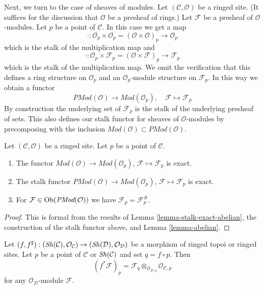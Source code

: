 \noindent
Next, we turn to the case of sheaves of modules.
Let $(\mathcal{C}, \mathcal{O})$ be a ringed site.
(It suffices for the discussion that $\mathcal{O}$ be a presheaf
of rings.)
Let $\mathcal{F}$ be a presheaf of $\mathcal{O}$-modules.
Let $p$ be a point of $\mathcal{C}$. In this case we get a map
$$
\cdot :
\mathcal{O}_p \times \mathcal{O}_p
=
(\mathcal{O} \times \mathcal{O})_p
\longrightarrow
\mathcal{O}_p
$$
which is the stalk of the multiplication map and
$$
\cdot :
\mathcal{O}_p \times \mathcal{F}_p
=
(\mathcal{O} \times \mathcal{F})_p
\longrightarrow
\mathcal{F}_p
$$
which is the stalk of the multiplication map. We omit the verification
that this defines a ring structure on $\mathcal{O}_p$ and an
$\mathcal{O}_p$-module structure on $\mathcal{F}_p$.
In this way we obtain a functor
$$
\textit{PMod}(\mathcal{O}) \longrightarrow \textit{Mod}(\mathcal{O}_p), \quad
\mathcal{F} \longmapsto \mathcal{F}_p
$$
By construction the underlying set of $\mathcal{F}_p$ is the stalk of the
underlying presheaf of sets. This also defines our stalk functor for
sheaves of $\mathcal{O}$-modules by precomposing with the inclusion
$\textit{Mod}(\mathcal{O}) \subset \textit{PMod}(\mathcal{O})$.

\begin{lemma}
\label{lemma-stalk-exact-modules}
Let $(\mathcal{C}, \mathcal{O})$ be a ringed site.
Let $p$ be a point of $\mathcal{C}$.
\begin{enumerate}
\item The functor
$\textit{Mod}(\mathcal{O}) \to \textit{Mod}(\mathcal{O}_p)$,
$\mathcal{F} \mapsto \mathcal{F}_p$ is exact.
\item The stalk functor
$\textit{PMod}(\mathcal{O}) \to \textit{Mod}(\mathcal{O}_p)$,
$\mathcal{F} \mapsto \mathcal{F}_p$
is exact.
\item For $\mathcal{F} \in \mathop{\mathrm{Ob}}\nolimits(\textit{PMod}(\mathcal{O}))$
we have $\mathcal{F}_p = \mathcal{F}^\#_p$.
\end{enumerate}
\end{lemma}

\begin{proof}
This is formal from the results of
Lemma \ref{lemma-stalk-exact-abelian},
the construction of the stalk functor above, and
Lemma \ref{lemma-abelian}.
\end{proof}

\begin{lemma}
\label{lemma-pullback-stalk}
Let
$(f, f^\sharp) :
(\mathop{\mathit{Sh}}\nolimits(\mathcal{C}), \mathcal{O}_\mathcal{C})
\to
(\mathop{\mathit{Sh}}\nolimits(\mathcal{D}), \mathcal{O}_\mathcal{D})$
be a morphism of ringed topoi or ringed sites.
Let $p$ be a point of $\mathcal{C}$ or $\mathop{\mathit{Sh}}\nolimits(\mathcal{C})$
and set $q = f \circ p$. Then
$$
(f^*\mathcal{F})_p =
\mathcal{F}_q \otimes_{\mathcal{O}_{\mathcal{D}, q}}
\mathcal{O}_{\mathcal{C}, p}
$$
for any $\mathcal{O}_\mathcal{D}$-module $\mathcal{F}$.
\end{lemma}

